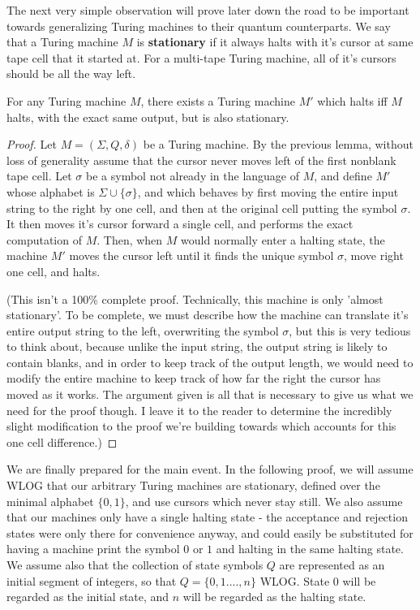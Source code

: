 The next very simple observation will prove later down the road to be important towards generalizing Turing machines to their quantum counterparts. We say that a Turing machine $M$ is \textbf{stationary} if it always halts with it's cursor at same tape cell that it started at. For a multi-tape Turing machine, all of it's cursors should be all the way left.
\begin{lemma}
	For any Turing machine $M$, there exists a Turing machine $M'$ which halts iff $M$ halts, with the exact same output, but is also stationary.
\end{lemma}
\begin{proof}
	Let $M = (\Sigma,Q,\delta)$ be a Turing machine. By the previous lemma, without loss of generality assume that the cursor never moves left of the first nonblank tape cell. Let $\sigma$ be a symbol not already in the language of $M$, and define $M'$ whose alphabet is $\Sigma \cup \{\sigma\}$, and which behaves by first moving the entire input string to the right by one cell, and then at the original cell putting the symbol $\sigma$. It then moves it's cursor forward a single cell, and performs the exact computation of $M$. Then, when $M$ would normally enter a halting state, the machine $M'$ moves the cursor left until it finds the unique symbol $\sigma$, move right one cell, and halts. \par (This isn't a 100\% complete proof. Technically, this machine is only 'almost stationary'. To be complete, we must describe how the machine can translate it's entire output string to the left, overwriting the symbol $\sigma$, but this is very tedious to think about, because unlike the input string, the output string is likely to contain blanks, and in order to keep track of the output length, we would need to modify the entire machine to keep track of how far the right the cursor has moved as it works. The argument given is all that is necessary to give us what we need for the proof though. I leave it to the reader to determine the incredibly slight modification to the proof we're building towards which accounts for this one cell difference.)
\end{proof}
We are finally prepared for the main event. In the following proof, we will assume WLOG that our arbitrary Turing machines are stationary, defined over the minimal alphabet $\{0,1\}$, and use cursors which never stay still. We also assume that our machines only have a single halting state - the acceptance and rejection states were only there for convenience anyway, and could easily be substituted for having a machine print the symbol $0$ or $1$ and halting in the same halting state. We assume also that the collection of state symbols $Q$ are represented as an initial segment of integers, so that $Q = \{0,1....,n\}$ WLOG. State $0$ will be regarded as the initial state, and $n$ will be regarded as the halting state.
